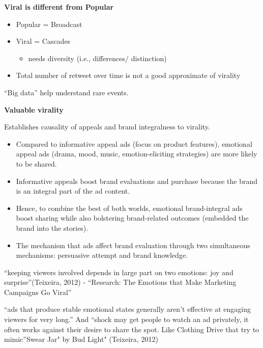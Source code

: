 \documentclass[
]{book}
\providecommand{\tightlist}{%
  \setlength{\itemsep}{0pt}\setlength{\parskip}{0pt}}
\begin{document}
\textbf{Viral is different from Popular} \citep{Goel_2015}

\begin{itemize}
\item
  Popular = Broadcast
\item
  Viral = Cascades

  \begin{itemize}
  \tightlist
  \item
    needs diversity (i.e., differences/ distinction)
  \end{itemize}
\item
  Total number of retweet over time is not a good approximate of virality
\end{itemize}

``Big data'' help understand rare events.

\textbf{Valuable virality} \citep{Akpinar_2017}

Establishes causality of appeals and brand integralness to virality.

\begin{itemize}
\tightlist
\item
  Compared to informative appeal ads (focus on product features), emotional appeal ads (drama, mood, music, emotion-eliciting strategies) are more likely to be shared.\\
\item
  Informative appeals boost brand evaluations and purchase because the brand is an integral part of the ad content.\\
\item
  Hence, to combine the best of both worlds, emotional brand-integral ads boost sharing while also bolstering brand-related outcomes (embedded the brand into the stories).\\
\item
  The mechanism that ads affect brand evaluation through two simultaneous mechanisms: persuasive attempt and brand knowledge.
\end{itemize}

``keeping viewers involved depends in large part on two emotions: joy and surprise''(Teixeira, 2012) - ``Research: The Emotions that Make Marketing Campaigns Go Viral''

``ads that produce stable emotional states generally aren't effective at engaging viewers for very long.'' And ``shock may get people to watch an ad privately, it often works against their desire to share the spot. Like Clothing Drive that try to mimic''Swear Jar" by Bud Light" (Teixeira, 2012)
\end{document}
